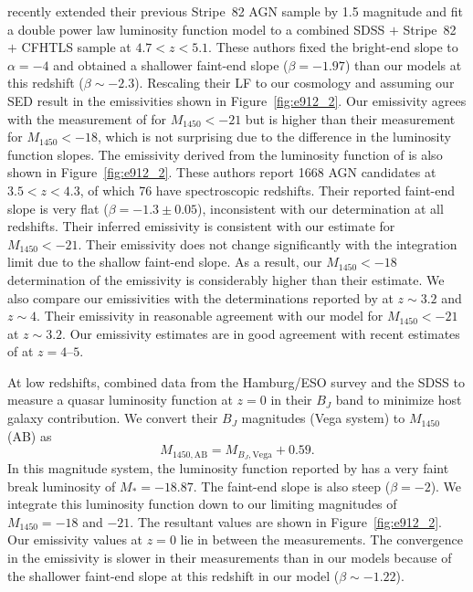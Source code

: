 \documentclass[fleqn,usenatbib]{mnras}
\begin{document}
      \citet{2018AJ....155..131M} recently extended their previous Stripe~82
      AGN sample by 1.5 magnitude and fit a double power law luminosity
      function model to a combined SDSS $+$ Stripe~82 $+$ CFHTLS sample at
      $4.7 < z < 5.1$.  These authors fixed the bright-end slope to
      $\alpha=-4$ and obtained a shallower faint-end slope ($\beta=-1.97$)
      than our models at this redshift ($\beta\sim -2.3$).  Rescaling their
      LF to our cosmology and assuming our SED result in the emissivities
      shown in Figure~\ref{fig:e912_2}.  Our emissivity agrees with the
      measurement of \citet{2018AJ....155..131M} for $M_{1450}<-21$ but is
      higher than their measurement for $M_{1450}<-18$, which is not
      surprising due to the difference in the luminosity function slopes.
      The emissivity derived from the luminosity function of
      \citet{2018PASJ...70S..34A} is also shown in Figure~\ref{fig:e912_2}.
      These authors report 1668 AGN candidates at $3.5<z<4.3$, of which 76
      have spectroscopic redshifts.  Their reported faint-end slope is very
      flat ($\beta=-1.3\pm 0.05$), inconsistent with our determination at
      all redshifts.  Their inferred emissivity is consistent with our
      estimate for $M_{1450}< -21$.  Their emissivity does not change
      significantly with the integration limit due to the shallow faint-end
      slope.  As a result, our $M_{1450}< -18$ determination of the
      emissivity is considerably higher than their estimate.  We also
      compare our emissivities with the determinations reported by
      \citet{2012ApJ...755..169M} at $z\sim 3.2$ and $z\sim 4$.  Their
      emissivity in reasonable agreement with our model for $M_{1450}<-21$
      at $z\sim 3.2$.  Our emissivity estimates are in good agreement with
      recent estimates of \citet{2018MNRAS.474.2904P} at $z=4$--$5$.

      At low redshifts, \citet{2009A&A...507..781S} combined data from the
      Hamburg/ESO survey and the SDSS to measure a quasar luminosity
      function at $z=0$ in their $B_J$ band to minimize host galaxy
      contribution.  We convert their $B_J$ magnitudes (Vega system) to
      $M_{1450}$ (AB) as
      \begin{equation}
        M_{1450,\mathrm{AB}}=M_{B_J, \mathrm{Vega}}+0.59.  
      \end{equation}
      In this magnitude system, the luminosity function reported by
      \citet{2009A&A...507..781S} has a very faint break luminosity of
      $M_*=-18.87$.  The faint-end slope is also steep ($\beta=-2$).  We
      integrate this luminosity function down to our limiting magnitudes of
      $M_{1450}=-18$ and $-21$.  The resultant values are shown in
      Figure~\ref{fig:e912_2}.  Our emissivity values at $z=0$ lie in
      between the \citet{2009A&A...507..781S} measurements.  The convergence
      in the emissivity is slower in their measurements than in our models
      because of the shallower faint-end slope at this redshift in our model
      ($\beta\sim -1.22$).  
\end{document}
